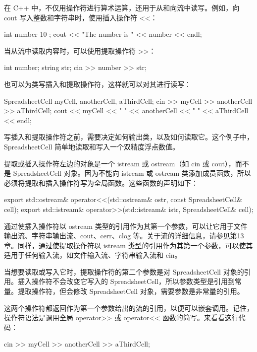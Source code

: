 在 C++ 中，不仅用操作符进行算术运算，还用于从和向流中读写。例如，向 cout 写入整数和字符串时，使用插入操作符 <{}<：

\begin{cpp}
int number { 10 };
cout << "The number is " << number << endl;
\end{cpp}

当从流中读取内容时，可以使用提取操作符 >{}>：

\begin{cpp}
int number;
string str;
cin >> number >> str;
\end{cpp}

也可以为类写插入和提取操作符，这样就可以对其进行读写：

\begin{cpp}
SpreadsheetCell myCell, anotherCell, aThirdCell;
cin >> myCell >> anotherCell >> aThirdCell;
cout << myCell << " " << anotherCell << " " << aThirdCell << endl;
\end{cpp}

写插入和提取操作符之前，需要决定如何输出类，以及如何读取它。这个例子中，SpreadsheetCell 简单地读取和写入一个双精度浮点数值。

提取或插入操作符左边的对象是一个 istream 或 ostream（如 cin 或 cout），而不是 SpreadsheetCell 对象。因为不能向 istream 或 ostream 类添加成员函数，所以必须将提取和插入操作符写为全局函数。这些函数的声明如下：

\begin{cpp}
export std::ostream& operator<<(std::ostream& ostr, const SpreadsheetCell& cell);
export std::istream& operator>>(std::istream& istr, SpreadsheetCell& cell);
\end{cpp}

通过使插入操作符以 ostream 类型的引用作为其第一个参数，可以让它用于文件输出流、字符串输出流、cout、cerr、clog 等。关于流的详细信息，请参见第13章。同样，通过使提取操作符以 istream 类型的引用作为其第一个参数，可以使其适用于任何输入流，如文件输入流、字符串输入流和 cin。

当想要读取或写入它时，提取操作符的第二个参数是对 SpreadsheetCell 对象的引用。插入操作符不会改变它写入的 SpreadsheetCell，所以参数类型是引用到常量。提取操作符，但会修改 SpreadsheetCell 对象，需要参数是非常量的引用。

这两个操作符都返回作为第一个参数给出的流的引用，以便可以嵌套调用。记住，操作符语法是调用全局 operator>{}> 或 operator<{}< 函数的简写。来看看这行代码：

\begin{cpp}
cin >> myCell >> anotherCell >> aThirdCell;
\end{cpp}

